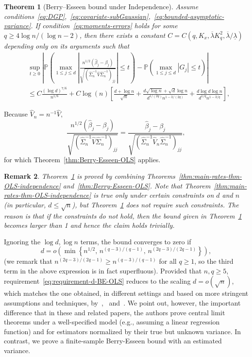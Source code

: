 \documentclass[11pt]{article}
\newtheorem{theorem}{Theorem}
\newtheorem{remark}[theorem]{Remark}
\begin{document}
\begin{theorem}[Berry--Esseen bound under Independence]\label{thm::berry-esseen}
Assume conditions~\ref{eq:DGP},~\ref{eq:covariate-subGaussian},~\ref{eq:bounded-asymptotic-variance}. If condition~\ref{eq:moments-errors} holds for some $q \ge 4\log n/(\log n - 2)$, then there exists a constant $C = C(q, K_x, \overline{\lambda} K_q^2, \overline{\lambda}/\underline{\lambda})$ depending only on its arguments such that
\begin{align*}
&\sup_{t\ge0}\left|\mathbb{P}\left(\max_{1\le j\le d}\left|\frac{n^{1/2}(\widehat{\beta}_j - \beta_j)}{\sqrt{(\widehat{\Sigma}_n^{-1}\widehat{V}\widehat{\Sigma}_n^{-1})_{jj}}}\right| \le t\right) - \mathbb{P}\left(\max_{1\le j\le d}|G_j| \le t\right)\right|\\ 
&\le C\frac{(\log d)^{7/6}}{n^{1/6}} + C\log(n)\left[\frac{d+\log n}{\sqrt{n}} + \frac{d\sqrt{\log n} + \sqrt{d}\log n}{d^{1/(2q)}n^{1-3/(2q)}} + \frac{d\log d\log n}{d^{1/q}n^{1 - 3/q}}\right],
\end{align*}
\end{theorem}
Because $\widehat{V}_n = n^{-1}\widehat{V}$,
\[
\frac{n^{1/2}(\widehat{\beta}_j - \beta_j)}{\sqrt{(\widehat{\Sigma}_n^{-1}\widehat{V}\widehat{\Sigma}_n^{-1})_{jj}}} = \frac{\widehat{\beta}_j - \beta_j}{\sqrt{(\widehat{\Sigma}_n^{-1}\widehat{V}_n\widehat{\Sigma}_n^{-1})_{jj}}},
\]
for which Theorem~\ref{thm:Berry-Esseen-OLS} applies.
\begin{remark}\label{rem:scaling-in-d}
Theorem~\ref{thm::berry-esseen} is proved by combining Theorems~\ref{thm:main-rates-thm-OLS-independence} and~\ref{thm:Berry-Esseen-OLS}. Note that Theorem~\ref{thm:main-rates-thm-OLS-independence} is true only under certain constraints on $d$ and $n$ (in particular, $d \le \sqrt{n}$), but Theorem~\ref{thm::berry-esseen} does not require such constraints. The reason is that if the constraints do not hold, then the bound given in Theorem~\ref{thm::berry-esseen} becomes larger than 1 and hence the claim holds trivially.
\end{remark}

Ignoring the $\log d, \log n$ terms, the bound converges to zero if 
\begin{equation}\label{eq:requirement-d-BE-OLS}
d = o\left(\min\left\{n^{1/2},\, n^{(q-3)/(q-1)},\, n^{(2q-3)/(2q-1)}\right\}\right),
\end{equation}
(we remark that $n^{(2q-3)/(2q-1)} \ge n^{(q-3)/(q-1)}$ for all $q\ge1$, so the third term in the above expression is in fact superfluous). Provided that $n, q \ge 5$, requirement~\eqref{eq:requirement-d-BE-OLS} reduces to the scaling $d = o(\sqrt{n})$, which matches the one obtained, in different settings and based on more stringent assumptions and techniques, by~\cite{Portnoy84,Portnoy85,Portnoy86,portnoy1987central,Portnoy88},~\cite{He2000} and~\cite{spokoiny2012parametric}. We point out, however, the important difference that in these and related papers, the authors prove central limit theorems under a well-specified model (e.g., assuming a linear regression function) and for  estimators normalized by their true but unknown variance. In contrast, we prove a finite-sample Berry-Esseen bound with an estimated variance. 
\end{document}
